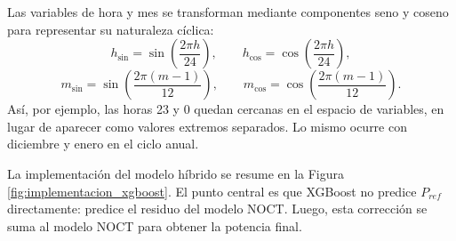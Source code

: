\documentclass[12pt, letterpaper]{article}
\begin{document}
Las variables de hora y mes se transforman mediante componentes seno y coseno para representar su naturaleza c\'iclica:
\[
    h_{\sin} = \sin\left(\frac{2\pi h}{24}\right),
    \qquad
    h_{\cos} = \cos\left(\frac{2\pi h}{24}\right),
\]
\[
    m_{\sin} = \sin\left(\frac{2\pi (m-1)}{12}\right),
    \qquad
    m_{\cos} = \cos\left(\frac{2\pi (m-1)}{12}\right).
\]
As\'i, por ejemplo, las horas 23 y 0 quedan cercanas en el espacio de variables, en lugar de aparecer como valores extremos separados. Lo mismo ocurre con diciembre y enero en el ciclo anual.

La implementaci\'on del modelo h\'ibrido se resume en la Figura \ref{fig:implementacion_xgboost}. El punto central es que XGBoost no predice \(P_{ref}\) directamente: predice el residuo del modelo NOCT. Luego, esta correcci\'on se suma al modelo NOCT para obtener la potencia final.
\end{document}
